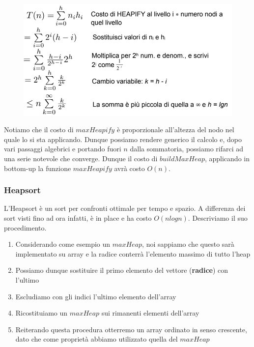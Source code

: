 \documentclass{article}
\begin{document}
\begin{enumerate}
    \begin{figure}[htbp]
        \center
        \includegraphics[scale=0.4]{img/costoHeap3.png}
    \end{figure}

Notiamo che il costo di $maxHeapify$ è proporzionale all'altezza del nodo nel quale lo si sta applicando. Dunque possiamo rendere generico il calcolo e, dopo vari passaggi algebrici e portando fuori $n$ dalla sommatoria, possiamo rifarci ad una serie notevole che converge. Dunque il costo di $buildMaxHeap$, applicando in bottom-up la funzione $maxHeapify$ avrà costo $O(n)$.
    
\end{enumerate}

\newpage

\subsubsection{Heapsort} L'Heapsort è un sort per confronti ottimale per tempo e spazio. A differenza dei sort visti fino ad ora infatti, è in place e ha costo $O(nlogn)$. Descriviamo il suo procedimento.

\begin{enumerate}
    \item Considerando come esempio un $maxHeap$, noi sappiamo che questo sarà implementato su array e la radice conterrà l'elemento massimo di tutto l'heap
    \item Possiamo dunque sostituire il primo elemento del vettore (\textbf{radice}) con l'ultimo
    \item Escludiamo con gli indici l'ultimo elemento dell'array
    \item Ricostituiamo un $maxHeap$ sui rimanenti elementi dell'array
    \item Reiterando questa procedura otterremo un array ordinato in senso crescente, dato che come proprietà abbiamo utilizzato quella del $maxHeap$
\end{enumerate}
\end{document}
